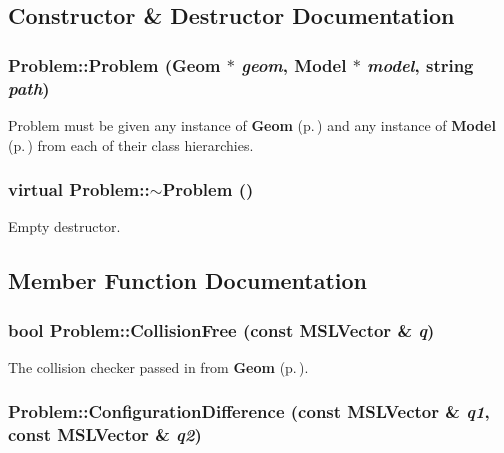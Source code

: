 \subsection{Constructor \& Destructor Documentation}
\subsubsection{\setlength{\rightskip}{0pt plus 5cm}Problem::Problem ({\bf Geom} $\ast$ {\em geom}, {\bf Model} $\ast$ {\em model}, string {\em path})}\label{classProblem_a0}


Problem must be given any instance of {\bf Geom} {\rm (p.\,\pageref{classGeom})} and any instance of {\bf Model} {\rm (p.\,\pageref{classModel})} from each of their class hierarchies.

\subsubsection{\setlength{\rightskip}{0pt plus 5cm}virtual Problem::$\sim$Problem ()\hspace{0.3cm}{\tt  [inline, virtual]}}\label{classProblem_a1}


Empty destructor.



\subsection{Member Function Documentation}
\subsubsection{\setlength{\rightskip}{0pt plus 5cm}bool Problem::Collision\-Free (const {\bf MSLVector} \& {\em q})\hspace{0.3cm}{\tt  [virtual]}}\label{classProblem_a12}


The collision checker passed in from {\bf Geom} {\rm (p.\,\pageref{classGeom})}.

\subsubsection{ Problem::Configuration\-Difference (const {\bf MSLVector} \& {\em q1}, const {\bf MSLVector} \& {\em q2})\hspace{0.3cm}{\tt  [virtual]}}\label{classProblem_a14}


